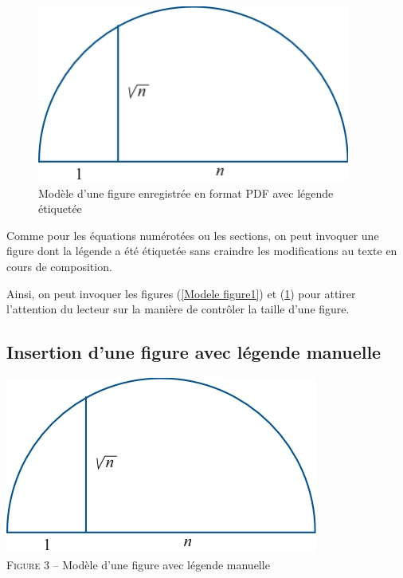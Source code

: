 \documentclass[10pt]{article}
\begin{document}
\begin{figure}[ht]
\centerline{\includegraphics[scale=.99]{pics/Figure2}} \caption{ \label{Modele figure2} Modèle d'une figure enregistrée en format PDF avec  légende étiquetée}
\end{figure}

Comme pour les équations numérotées ou les sections, on peut invoquer
une figure dont la légende a été étiquetée sans craindre les
modifications au texte en cours de composition.

Ainsi, on peut invoquer les figures (\ref{Modele figure1}) et
(\ref{Modele figure2}) pour attirer l'attention du lecteur sur la
manière de contrôler la taille d'une figure.

\hypertarget{insertion-dune-figure-avec-luxe9gende-manuelle}{%
\subsection{\texorpdfstring{Insertion d'une figure avec légende manuelle
\label{leg+manu}}{Insertion d'une figure avec légende manuelle }}\label{insertion-dune-figure-avec-luxe9gende-manuelle}}

\begin{center}
\includegraphics[scale=.99]{pics/Figure1}\\
{\small \textsc{Figure 3} -- Modèle d'une figure avec légende manuelle}
\end{center}
\end{document}
